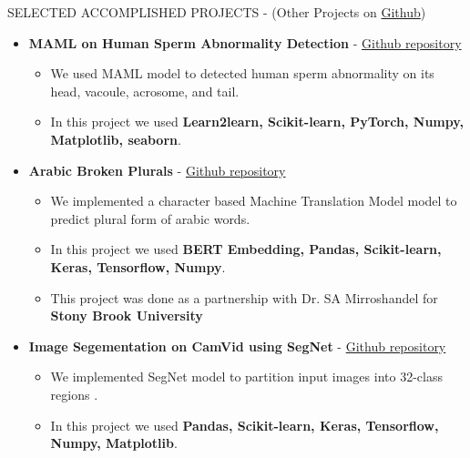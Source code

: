 \documentclass[]{CV}
\begin{document}
\vspace{-4mm}
\begin{section}{SELECTED ACCOMPLISHED PROJECTS { - (Other Projects on \href{https://github.com/amirkasaei}{Github})}}
\begin{itemize}

\item \textbf{MAML on Human Sperm Abnormality Detection} - \href{https://github.com/amirkasaei/Modified-Human-Sperm-Morphology-Analysis}{Github repository}
\begin{itemize}
\vspace{-2mm}
        \item We used MAML model to detected human sperm abnormality on its head, vacoule, acrosome, and tail. \vspace{-2mm}
        \item In this project we used \textbf{Learn2learn, Scikit-learn, PyTorch, Numpy, Matplotlib, seaborn}.
    \end{itemize}
    
\item \textbf{Arabic Broken Plurals} - \href{https://github.com/amirkasaei/Arabic-Broken-Plurals}{Github repository}
   \begin{itemize}
        \item We implemented a character based Machine Translation Model model to predict plural form of arabic words.\vspace{-2mm}
        \item In this project we used \textbf{BERT Embedding, Pandas, Scikit-learn, Keras, Tensorflow, Numpy}.\vspace{-2mm}
        \item This project was done as a partnership with Dr. SA Mirroshandel for \textbf{Stony Brook University}
    \end{itemize}
    
\item \textbf{Image Segementation on CamVid using SegNet} - \href{https://github.com/amirkasaei/Image-Segementation-CamVid-using-SegNet}{Github repository}
   \begin{itemize}
        \item We implemented SegNet model to partition input images into 32-class regions .\vspace{-2mm}
        \item In this project we used \textbf{Pandas, Scikit-learn, Keras, Tensorflow, Numpy, Matplotlib}.
    \end{itemize}
    

\end{itemize}
\end{section}
\end{document}
